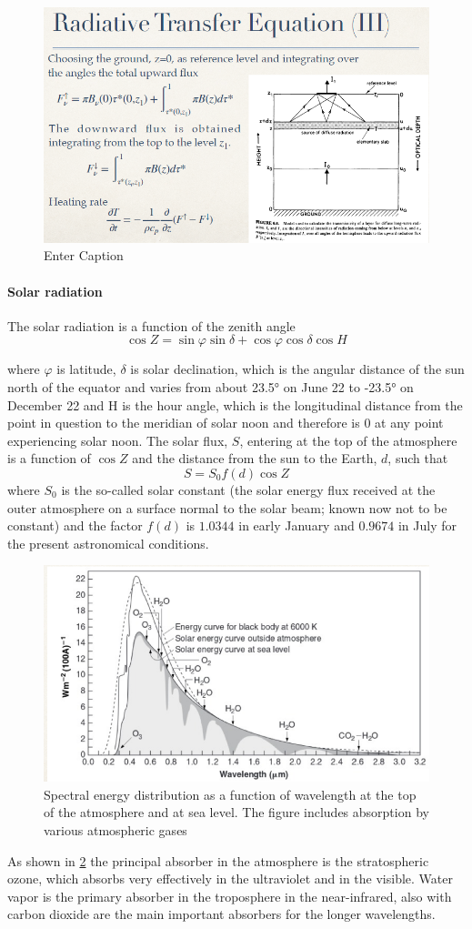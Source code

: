 \begin{figure}[htpb]
	\centering
	\includegraphics[width=0.5\linewidth]{uploads/18image.png}
	\caption{Enter Caption}
	\label{fig:enter-label}
\end{figure}

\paragraph{Solar radiation} The solar radiation is a function of the zenith angle
$$\cos Z = \sin \varphi \sin \delta + \cos \varphi \cos \delta \cos H$$

where $\varphi$ is latitude, $\delta$ is solar declination, which is the angular distance of the sun north of the equator and varies from about 23.5° on June 22 to -23.5° on December 22 and H is the hour angle, which is the longitudinal distance from the point in question to the meridian of solar noon and therefore is 0 at any point experiencing solar noon.
The solar flux, $S$, entering at the top of the atmosphere is a function of $\cos Z$ and the distance from the sun to the Earth, $d$, such that
$$S = S_0 f(d) \cos Z$$
where $S_{0}$ is the so-called solar constant (the solar energy flux received at the outer atmosphere on a surface normal to the solar beam; known now not to be constant) and the factor $f(d)$ is $1.0344$ in early January and $0.9674$ in July for the present astronomical conditions.
\begin{figure}[htp!]
	\centering
	\includegraphics[width=0.5\linewidth]{uploads/image12.png}
	\caption{Spectral energy distribution as a function of wavelength at the top of the atmosphere and at sea level. The figure includes absorption by various atmospheric gases}
	\label{fig1}

\end{figure}
As shown in \ref{fig1} the principal absorber in the atmosphere is the stratospheric ozone, which absorbs very effectively in the ultraviolet and in the visible. Water vapor is the primary absorber in the troposphere in the near-infrared, also with carbon dioxide are the main important absorbers for the longer wavelengths.


